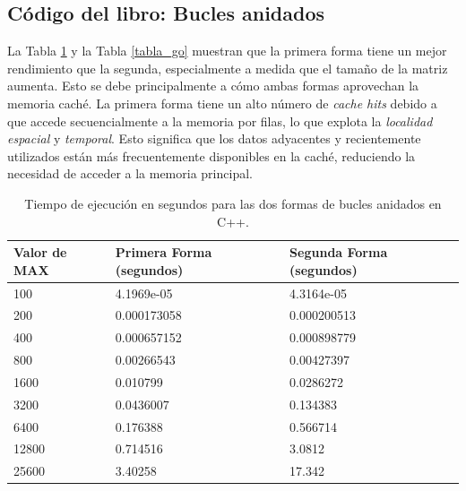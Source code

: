 \documentclass[conference]{IEEEtran}
\begin{document}
\subsection{\textbf{Código del libro: Bucles anidados}}

La Tabla \ref{tabla_cpp} y la Tabla \ref{tabla_go} muestran que la primera forma tiene un mejor 
rendimiento que la segunda, especialmente a medida que el tamaño de la matriz aumenta. Esto se debe
principalmente a cómo ambas formas aprovechan la memoria caché. La primera forma tiene un alto número 
de \textit{cache hits} debido a que accede secuencialmente a la memoria por filas, lo que explota la
\textit{localidad espacial} y \textit{temporal}. Esto significa que los datos adyacentes y recientemente 
utilizados están más frecuentemente disponibles en la caché, reduciendo la necesidad de acceder a la memoria principal.

\begin{table}[h!]
    \centering
    \begin{tabularx}{250pt}{|X|X|X|}
        \hline
        \textbf{Valor de MAX} & \textbf{Primera Forma (segundos)} & \textbf{Segunda Forma (segundos)} \\ \hline
        100                   & 4.1969e-05                        & 4.3164e-05                        \\ \hline
        200                   & 0.000173058                       & 0.000200513                       \\ \hline
        400                   & 0.000657152                       & 0.000898779                       \\ \hline
        800                   & 0.00266543                        & 0.00427397                        \\ \hline
        1600                  & 0.010799                          & 0.0286272                         \\ \hline
        3200                  & 0.0436007                         & 0.134383                          \\ \hline
        6400                  & 0.176388                          & 0.566714                          \\ \hline
        12800                 & 0.714516                          & 3.0812                            \\ \hline
        25600                 & 3.40258                           & 17.342                            \\ \hline
    \end{tabularx}
    \caption{Tiempo de ejecución en segundos para las dos formas de bucles anidados en C++.}
    \label{tabla_cpp}
\end{table}
\end{document}
